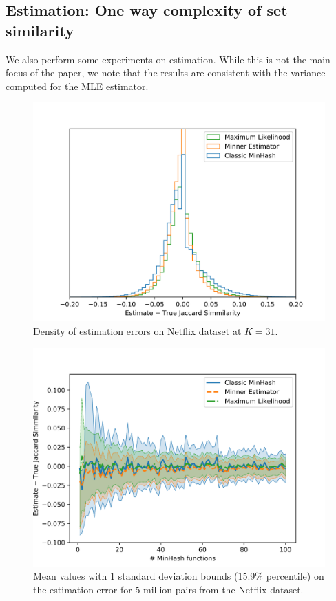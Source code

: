 \subsection{Estimation: One way complexity of set similarity}

We also perform some experiments on estimation.
While this is not the main focus of the paper, we note that the results are consistent with the variance computed for the MLE estimator.

\begin{figure}[h]
   \centering
   \includegraphics[trim=0 5 35 40,clip,width=\linewidth]{figures/hist2}
\caption{Density of estimation errors on Netflix dataset at $K=31$.
}
\end{figure}

\begin{figure}[h]
   \centering
   \includegraphics[trim=0 0 35 40,clip,width=\linewidth]{figures/var2}
   \caption{
      Mean values with 1 standard deviation bounds (15.9\% percentile)
      on the estimation error for 5 million pairs from the Netflix dataset.
   }
\end{figure}
